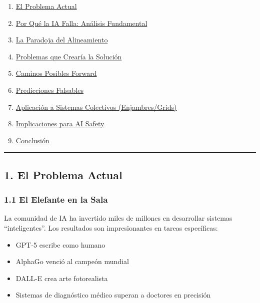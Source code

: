 \begin{enumerate}
\def\labelenumi{\arabic{enumi}.}
\tightlist
\item
  \hyperref[1-el-problema-actual]{El Problema Actual}
\item
  \hyperref[2-por-quuxe9-la-ia-falla]{Por Qué la IA Falla: Análisis
  Fundamental}
\item
  \hyperref[3-la-paradoja-del-alineamiento]{La Paradoja del
  Alineamiento}
\item
  \hyperref[4-problemas-que-crearuxeda-la-soluciuxf3n]{Problemas que
  Crearía la Solución}
\item
  \hyperref[5-caminos-posibles-forward]{Caminos Posibles Forward}
\item
  \hyperref[6-predicciones-falsables]{Predicciones Falsables}
\item
  \hyperref[7-aplicaciuxf3n-a-sistemas-colectivos]{Aplicación a Sistemas
  Colectivos (Enjambres/Grids)}
\item
  \hyperref[8-implicaciones-para-ai-safety]{Implicaciones para AI
  Safety}
\item
  \hyperref[9-conclusiuxf3n]{Conclusión}
\end{enumerate}

\begin{center}\rule{0.5\linewidth}{0.5pt}\end{center}

\subsection{1. El Problema Actual}\label{el-problema-actual}

\subsubsection{1.1 El Elefante en la Sala}\label{el-elefante-en-la-sala}

La comunidad de IA ha invertido miles de millones en desarrollar
sistemas ``inteligentes''. Los resultados son impresionantes en tareas
específicas:

\begin{itemize}
\tightlist
\item
  GPT-5 escribe como humano
\item
  AlphaGo venció al campeón mundial
\item
  DALL-E crea arte fotorealista
\item
  Sistemas de diagnóstico médico superan a doctores en precisión
\end{itemize}

